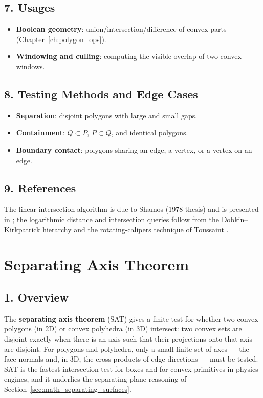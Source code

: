 \subsection{7. Usages}

\begin{itemize}
\item \textbf{Boolean geometry}: union/intersection/difference of convex
  parts (Chapter~\ref{ch:polygon_ops}).
\item \textbf{Windowing and culling}: computing the visible overlap of two
  convex windows.
\end{itemize}

\subsection{8. Testing Methods and Edge Cases}

\begin{itemize}
\item \textbf{Separation}: disjoint polygons with large and small gaps.
\item \textbf{Containment}: $Q \subset P$, $P \subset Q$, and identical
  polygons.
\item \textbf{Boundary contact}: polygons sharing an edge, a vertex, or a
  vertex on an edge.
\end{itemize}

\subsection{9. References}

The linear intersection algorithm is due to Shamos (1978 thesis) and is
presented in \cite{preparata1985}; the logarithmic distance and
intersection queries follow from the Dobkin--Kirkpatrick hierarchy
\cite{dobkin1983,dobkin1985} and the rotating-calipers technique of
Toussaint \cite{toussaint1983}.

\section{Separating Axis Theorem}
\label{sec:convexint_sat}

\subsection{1. Overview}

The \textbf{separating axis theorem} (SAT)
gives a finite test for whether two convex polygons (in 2D) or convex
polyhedra (in 3D) intersect: two convex sets are disjoint exactly when
there is an axis such that their projections onto that axis are disjoint.
For polygons and polyhedra, only a small finite set of axes --- the face
normals and, in 3D, the cross products of edge directions --- must be
tested. SAT is the fastest intersection test for boxes and for convex
primitives in physics engines, and it underlies the separating plane
reasoning of Section~\ref{sec:math_separating_surfaces}.

